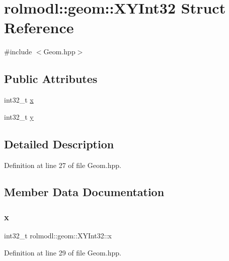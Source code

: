 \hypertarget{structrolmodl_1_1geom_1_1_x_y_int32}{}\section{rolmodl\+::geom\+::X\+Y\+Int32 Struct Reference}
\label{structrolmodl_1_1geom_1_1_x_y_int32}


{\ttfamily \#include $<$Geom.\+hpp$>$}

\subsection*{Public Attributes}
\begin{DoxyCompactItemize}
\item 
int32\+\_\+t \mbox{\hyperlink{structrolmodl_1_1geom_1_1_x_y_int32_a16d72acb01326ee7059e9d08c7b154f2}{x}}
\item 
int32\+\_\+t \mbox{\hyperlink{structrolmodl_1_1geom_1_1_x_y_int32_a26d3b524bd630de2d06bc605bd5634fa}{y}}
\end{DoxyCompactItemize}


\subsection{Detailed Description}


Definition at line 27 of file Geom.\+hpp.



\subsection{Member Data Documentation}
\mbox{\label{structrolmodl_1_1geom_1_1_x_y_int32_a16d72acb01326ee7059e9d08c7b154f2}} 
\subsubsection{\texorpdfstring{x}{x}}
{\footnotesize\ttfamily int32\+\_\+t rolmodl\+::geom\+::\+X\+Y\+Int32\+::x}



Definition at line 29 of file Geom.\+hpp.

\mbox{\label{structrolmodl_1_1geom_1_1_x_y_int32_a26d3b524bd630de2d06bc605bd5634fa}} 
